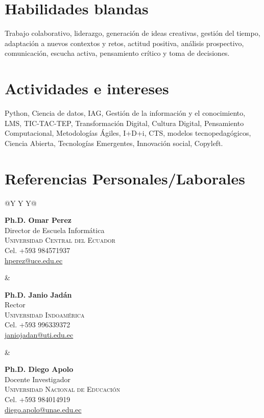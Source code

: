 \documentclass[a4paper]{article}
\newcommand{\refe}[5]{%
  \parbox[t]{\linewidth}{\small
    \textbf{#1}\\
    #2\\
    \textsc{#3}\\
    #4\\
    \href{mailto:#5}{#5}%
  }%
}
\begin{document}
\section{Habilidades blandas}
Trabajo colaborativo, liderazgo, generación de ideas creativas, gestión del tiempo, adaptación a nuevos contextos y retos, actitud positiva, análisis  prospectivo, comunicación, escucha activa,  pensamiento crítico  y toma de decisiones. 
\section{Actividades e intereses}
Python, Ciencia de datos, IAG, Gestión de la información y el conocimiento, LMS, TIC-TAC-TEP, Transformación Digital, Cultura Digital, Pensamiento Computacional, Metodologías Ágiles,  I+D+i, CTS, modelos tecnopedagógicos, Ciencia Abierta, Tecnologías Emergentes, Innovación social, Copyleft.
\section{Referencias Personales/Laborales}

\begin{center}
\setlength{\tabcolsep}{10pt}
\renewcommand{\arraystretch}{1.1}
\begin{tabularx}{\textwidth}{@{}Y Y Y@{}}
\refe{Ph.D. Omar Perez}{Director de Escuela Informática}
     {Universidad Central del Ecuador}{Cel. +593 984571937}{hperez@uce.edu.ec}
&
\refe{Ph.D. Janio Jadán}{Rector}
     {Universidad Indoamérica}{Cel. +593 996339372}{janiojadan@uti.edu.ec}
&
\refe{Ph.D. Diego Apolo}{Docente Investigador}
     {Universidad Nacional de Educación}{Cel. +593 984014919}{diego.apolo@unae.edu.ec}
\end{tabularx}
\end{center}
\end{document}
